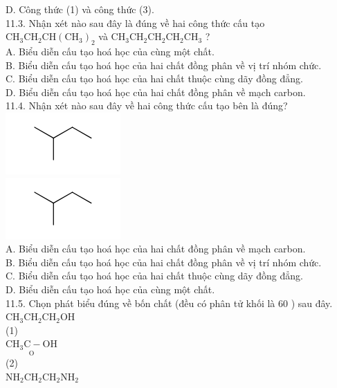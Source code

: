 \documentclass[10pt]{article}
\begin{document}
D. Công thức (1) và công thức (3).\\
11.3. Nhận xét nào sau đây là đúng về hai công thức cấu tạo $\mathrm{CH}_{3} \mathrm{CH}_{2} \mathrm{CH}\left(\mathrm{CH}_{3}\right)_{2}$ và $\mathrm{CH}_{3} \mathrm{CH}_{2} \mathrm{CH}_{2} \mathrm{CH}_{2} \mathrm{CH}_{3}$ ?\\
A. Biểu diễn cấu tạo hoá học của cùng một chất.\\
B. Biểu diễn cấu tạo hoá học của hai chất đồng phân về vị trí nhóm chức.\\
C. Biểu diễn cấu tạo hoá học của hai chất thuộc cùng dãy đồng đẳng.\\
D. Biểu diễn cấu tạo hoá học của hai chất đồng phân về mạch carbon.\\
11.4. Nhận xét nào sau đây về hai công thức cấu tạo bên là đúng?\\
\includegraphics{smile-382ddbb66cbce9dafe6fc6503a49effc6ccd79c0}\\
\includegraphics{smile-98adf0a9ce924f3d6d9b8d955c02327cef4b3a24}\\
A. Biểu diễn cấu tạo hoá học của hai chất đồng phân về mạch carbon.\\
B. Biểu diễn cấu tạo hoá học của hai chất đồng phân về vị trí nhóm chức.\\
C. Biểu diễn cấu tạo hoá học của hai chất thuộc cùng dãy đồng đẳng.\\
D. Biểu diễn cấu tạo hoá học của cùng một chất.\\
11.5. Chọn phát biểu đúng về bốn chất (đều có phân tử khối là 60 ) sau đây.\\
$\mathrm{CH}_{3} \mathrm{CH}_{2} \mathrm{CH}_{2} \mathrm{OH}$\\
(1)\\
$\underset{\text { O }}{\mathrm{CH}_{3} \mathrm{C}-\mathrm{OH}}$\\
(2)\\
$\mathrm{NH}_{2} \mathrm{CH}_{2} \mathrm{CH}_{2} \mathrm{NH}_{2}$\\
\end{document}
